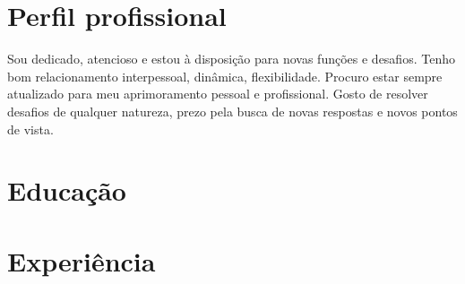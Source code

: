 \documentclass[letterpaper]{twentysecondcv} %
\begin{document}
\makeprofile %

\section{Perfil profissional}

Sou dedicado, atencioso e estou à disposição para novas funções e desafios. Tenho bom relacionamento interpessoal, dinâmica, flexibilidade. Procuro estar sempre atualizado para meu aprimoramento pessoal e profissional. Gosto de resolver desafios de qualquer natureza, prezo pela busca de novas respostas e novos pontos de vista. \vspace{2mm}

\section{Educação}



\section{Experiência}
\end{document}
